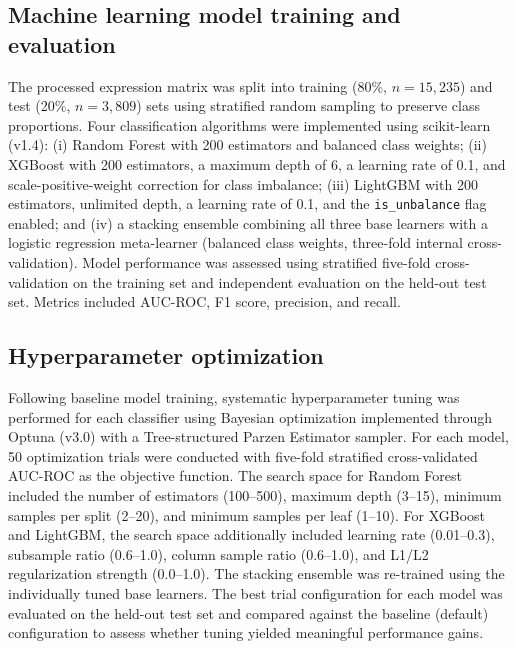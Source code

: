 \documentclass[12pt]{article}
\begin{document}
\subsection*{Machine learning model training and evaluation}

The processed expression matrix was split into training (80\%, $n = 15{,}235$) and test (20\%, $n = 3{,}809$) sets using stratified random sampling to preserve class proportions. Four classification algorithms were implemented using scikit-learn (v1.4)\cite{pedregosa2011}: (i) Random Forest with 200 estimators and balanced class weights\cite{breiman2001}; (ii) XGBoost with 200 estimators, a maximum depth of 6, a learning rate of 0.1, and scale-positive-weight correction for class imbalance\cite{chen2016}; (iii) LightGBM with 200 estimators, unlimited depth, a learning rate of 0.1, and the \texttt{is\_unbalance} flag enabled\cite{ke2017}; and (iv) a stacking ensemble combining all three base learners with a logistic regression meta-learner (balanced class weights, three-fold internal cross-validation)\cite{wolpert1992}. Model performance was assessed using stratified five-fold cross-validation on the training set and independent evaluation on the held-out test set. Metrics included AUC-ROC, F1 score, precision, and recall.

\subsection*{Hyperparameter optimization}

Following baseline model training, systematic hyperparameter tuning was performed for each classifier using Bayesian optimization implemented through Optuna (v3.0) with a Tree-structured Parzen Estimator sampler\cite{akiba2019}. For each model, 50 optimization trials were conducted with five-fold stratified cross-validated AUC-ROC as the objective function. The search space for Random Forest included the number of estimators (100--500), maximum depth (3--15), minimum samples per split (2--20), and minimum samples per leaf (1--10). For XGBoost and LightGBM, the search space additionally included learning rate (0.01--0.3), subsample ratio (0.6--1.0), column sample ratio (0.6--1.0), and L1/L2 regularization strength (0.0--1.0). The stacking ensemble was re-trained using the individually tuned base learners. The best trial configuration for each model was evaluated on the held-out test set and compared against the baseline (default) configuration to assess whether tuning yielded meaningful performance gains.
\end{document}
